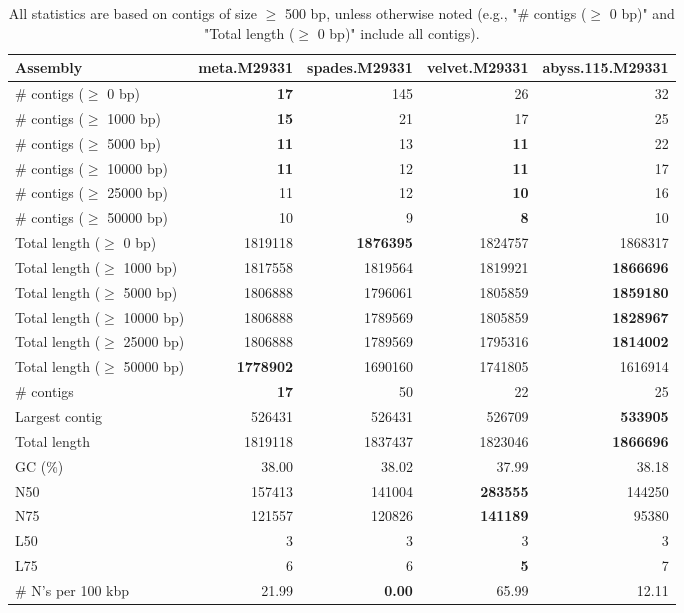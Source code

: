 \documentclass[12pt,a4paper]{article}
\begin{document}
\begin{table}[ht]
\begin{center}
\caption{All statistics are based on contigs of size $\geq$ 500 bp, unless otherwise noted (e.g., "\# contigs ($\geq$ 0 bp)" and "Total length ($\geq$ 0 bp)" include all contigs).}
\begin{tabular}{|l*{4}{|r}|}
\hline
Assembly & meta.M29331 & spades.M29331 & velvet.M29331 & abyss.115.M29331 \\ \hline
\# contigs ($\geq$ 0 bp) & {\bf 17} & 145 & 26 & 32 \\ \hline
\# contigs ($\geq$ 1000 bp) & {\bf 15} & 21 & 17 & 25 \\ \hline
\# contigs ($\geq$ 5000 bp) & {\bf 11} & 13 & {\bf 11} & 22 \\ \hline
\# contigs ($\geq$ 10000 bp) & {\bf 11} & 12 & {\bf 11} & 17 \\ \hline
\# contigs ($\geq$ 25000 bp) & 11 & 12 & {\bf 10} & 16 \\ \hline
\# contigs ($\geq$ 50000 bp) & 10 & 9 & {\bf 8} & 10 \\ \hline
Total length ($\geq$ 0 bp) & 1819118 & {\bf 1876395} & 1824757 & 1868317 \\ \hline
Total length ($\geq$ 1000 bp) & 1817558 & 1819564 & 1819921 & {\bf 1866696} \\ \hline
Total length ($\geq$ 5000 bp) & 1806888 & 1796061 & 1805859 & {\bf 1859180} \\ \hline
Total length ($\geq$ 10000 bp) & 1806888 & 1789569 & 1805859 & {\bf 1828967} \\ \hline
Total length ($\geq$ 25000 bp) & 1806888 & 1789569 & 1795316 & {\bf 1814002} \\ \hline
Total length ($\geq$ 50000 bp) & {\bf 1778902} & 1690160 & 1741805 & 1616914 \\ \hline
\# contigs & {\bf 17} & 50 & 22 & 25 \\ \hline
Largest contig & 526431 & 526431 & 526709 & {\bf 533905} \\ \hline
Total length & 1819118 & 1837437 & 1823046 & {\bf 1866696} \\ \hline
GC (\%) & 38.00 & 38.02 & 37.99 & 38.18 \\ \hline
N50 & 157413 & 141004 & {\bf 283555} & 144250 \\ \hline
N75 & 121557 & 120826 & {\bf 141189} & 95380 \\ \hline
L50 & 3 & 3 & 3 & 3 \\ \hline
L75 & 6 & 6 & {\bf 5} & 7 \\ \hline
\# N's per 100 kbp & 21.99 & {\bf 0.00} & 65.99 & 12.11 \\ \hline
\end{tabular}
\end{center}
\end{table}
\end{document}
